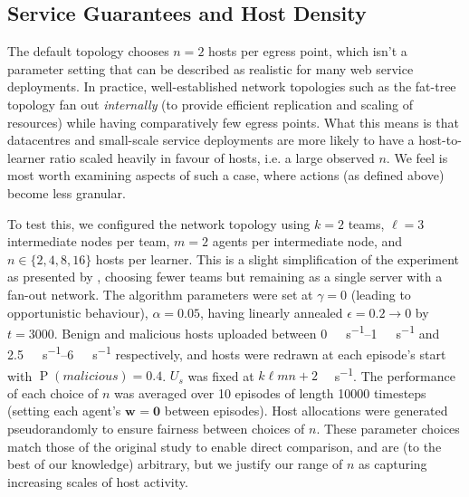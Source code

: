 \documentclass[conference, a4paper, 10pt, times]{IEEEtran}
\newcommand{\wvec}[1]{\ensuremath{\bm{w}_{#1}}}
\begin{document}

\subsection{Service Guarantees and Host Density}
The default topology chooses $n=2$ hosts per egress point, which isn't a parameter setting that can be described as realistic for many web service deployments.
In practice, well-established network topologies such as the fat-tree topology fan out \emph{internally} (to provide efficient replication and scaling of resources) while having comparatively few egress points.
What this means is that datacentres and small-scale service deployments are more likely to have a host-to-learner ratio scaled heavily in favour of hosts, i.e. a large observed $n$.
We feel is most worth examining aspects of such a case, where actions (as defined above) become less granular.

To test this, we configured the network topology using $k=2$ teams, $\ell=3$ intermediate nodes per team, $m=2$ agents per intermediate node, and $n \in \{2, 4, 8, 16\}$ hosts per learner.
This is a slight simplification of the  experiment as presented by \textcite{DBLP:journals/eaai/MalialisK15}, choosing fewer teams but remaining as a single server with a fan-out network.
The algorithm parameters were set at $\gamma=0$ (leading to opportunistic behaviour), $\alpha=0.05$, having linearly annealed $\epsilon=0.2 \rightarrow 0$ by $t=3000$.
Benign and malicious hosts uploaded between \SIrange{0}{1}{\mega\bit\per\second} and \SIrange{2.5}{6}{\mega\bit\per\second} respectively, and hosts were redrawn at each episode's start with $\operatorname{P}(\mathit{malicious})=0.4$.
$U_s$ was fixed at $k \ell mn+2$ \si{\mega\bit\per\second}.
The performance of each choice of $n$ was averaged over \num{10} episodes of length \num{10000} timesteps (setting each agent's $\wvec{}=\bm{0}$ between episodes).
Host allocations were generated pseudorandomly to ensure fairness between choices of $n$.
These parameter choices match those of the original study to enable direct comparison, and are (to the best of our knowledge) arbitrary, but we justify our range of $n$ as capturing increasing scales of host activity.
\end{document}
